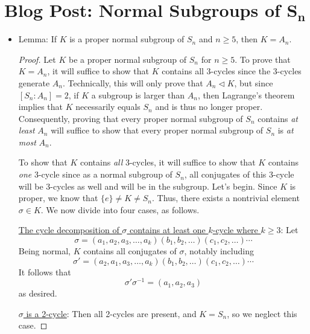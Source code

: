 \documentclass[../notes.tex]{subfiles}
\begin{document}
\section[Blog Post: Normal Subgroups of \texorpdfstring{$S_n$}{TEXT}]{Blog Post: Normal Subgroups of \texorpdfstring{$\bm{S_n}$}{TEXT}}
\begin{itemize}
    \item {}Lemma: If $K$ is a proper normal subgroup of $S_n$ and $n\geq 5$, then $K=A_n$.
    \begin{proof}
        Let $K$ be a proper normal subgroup of $S_n$ for $n\geq 5$. To prove that $K=A_n$, it will suffice to show that $K$ contains all 3-cycles since the 3-cycles generate $A_n$. Technically, this will only prove that $A_n\triangleleft K$, but since $[S_n:A_n]=2$, if $K$ a subgroup is larger than $A_n$, then Lagrange's theorem implies that $K$ necessarily equals $S_n$ and is thus no longer proper. Consequently, proving that every proper normal subgroup of $S_n$ contains \emph{at least} $A_n$ will suffice to show that every proper normal subgroup of $S_n$ is \emph{at most} $A_n$.\par
        To show that $K$ contains \emph{all} 3-cycles, it will suffice to show that $K$ contains \emph{one} 3-cycle since as a normal subgroup of $S_n$, all conjugates of this 3-cycle will be 3-cycles as well and will be in the subgroup. Let's begin. Since $K$ is proper, we know that $\{e\}\neq K\neq S_n$. Thus, there exists a nontrivial element $\sigma\in K$. We now divide into four cases, as follows.\par
        \underline{The cycle decomposition of $\sigma$ contains at least one $k$-cycle where $k\geq 3$}: Let
        \begin{equation*}
            \sigma = (a_1,a_2,a_3,\dots,a_k)(b_1,b_2,\dots)(c_1,c_2,\dots)\cdots
        \end{equation*}
        Being normal, $K$ contains all conjugates of $\sigma$, notably including
        \begin{equation*}
            \sigma' = (a_2,a_1,a_3,\dots,a_k)(b_1,b_2,\dots)(c_1,c_2,\dots)\cdots
        \end{equation*}
        It follows that
        \begin{equation*}
            \sigma'\sigma^{-1} = (a_1,a_2,a_3)
        \end{equation*}
        as desired.\par
        \underline{$\sigma$ is a 2-cycle}: Then all 2-cycles are present, and $K=S_n$, so we neglect this case.\par

\end{proof}
\end{itemize}
\end{document}
